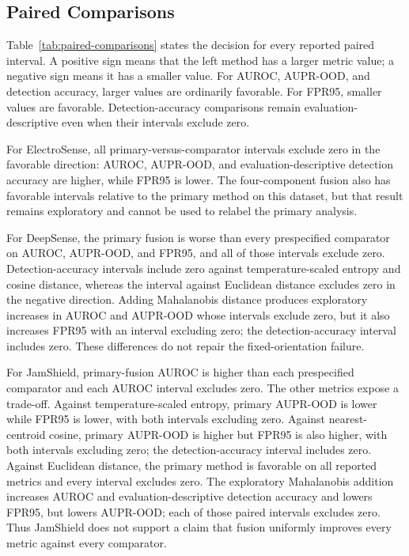 \subsection{Paired Comparisons}

Table~\ref{tab:paired-comparisons} states the decision for every reported paired interval. A positive sign means that the left method has a larger metric value; a negative sign means it has a smaller value. For AUROC, AUPR-OOD, and detection accuracy, larger values are ordinarily favorable. For FPR95, smaller values are favorable. Detection-accuracy comparisons remain evaluation-descriptive even when their intervals exclude zero.



For ElectroSense, all primary-versus-comparator intervals exclude zero in the favorable direction: AUROC, AUPR-OOD, and evaluation-descriptive detection accuracy are higher, while FPR95 is lower. The four-component fusion also has favorable intervals relative to the primary method on this dataset, but that result remains exploratory and cannot be used to relabel the primary analysis.

For DeepSense, the primary fusion is worse than every prespecified comparator on AUROC, AUPR-OOD, and FPR95, and all of those intervals exclude zero. Detection-accuracy intervals include zero against temperature-scaled entropy and cosine distance, whereas the interval against Euclidean distance excludes zero in the negative direction. Adding Mahalanobis distance produces exploratory increases in AUROC and AUPR-OOD whose intervals exclude zero, but it also increases FPR95 with an interval excluding zero; the detection-accuracy interval includes zero. These differences do not repair the fixed-orientation failure.

For JamShield, primary-fusion AUROC is higher than each prespecified comparator and each AUROC interval excludes zero. The other metrics expose a trade-off. Against temperature-scaled entropy, primary AUPR-OOD is lower while FPR95 is lower, with both intervals excluding zero. Against nearest-centroid cosine, primary AUPR-OOD is higher but FPR95 is also higher, with both intervals excluding zero; the detection-accuracy interval includes zero. Against Euclidean distance, the primary method is favorable on all reported metrics and every interval excludes zero. The exploratory Mahalanobis addition increases AUROC and evaluation-descriptive detection accuracy and lowers FPR95, but lowers AUPR-OOD; each of those paired intervals excludes zero. Thus JamShield does not support a claim that fusion uniformly improves every metric against every comparator.


